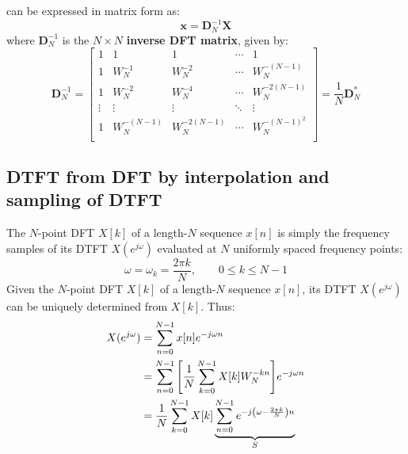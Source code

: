\documentclass[../../main/main.tex]{subfiles}
\begin{document}
can be expressed in matrix form as:
\begin{equation}
    \mathbf{x}
    =
    \mathbf{D}_{N}^{-1} \mathbf{X}
    \label{eq:L12_S18_2}
\end{equation}
where \( \mathbf{D}_{N}^{-1} \) is the \( N \times N \) \textbf{inverse DFT matrix}, given by:
\begin{equation}
    \mathbf{D}_{N}^{-1}
    =
    \begin{bmatrix}
        1   &   1   &   1   &   \cdots & 1   \\
        1   &   W_{N}^{-1}   &   W_{N}^{-2}   &   \cdots & W_{N}^{-(N-1)}   \\
        1   &   W_{N}^{-2}   &   W_{N}^{-4}   &   \cdots & W_{N}^{-2(N-1)}   \\
        \vdots  &   \vdots  &   \vdots  &   \ddots  &   \vdots  \\
        1   &   W_{N}^{-(N-1)}   &   W_{N}^{-2(N-1)}   &   \cdots & W_{N}^{-(N-1)^2}   \\
    \end{bmatrix}
    =
    \frac{1}{N} \mathbf{D}_{N}^{*}
    \label{eq:L12_S19_1}
\end{equation}



\subsection{DTFT from DFT by interpolation and sampling of DTFT}
The \( N \)-point DFT \( X[k] \) of a length-\( N \) sequence \( x[n] \) is simply the frequency samples of its DTFT \( X(e^{j\omega}) \) evaluated at \( N \) uniformly spaced frequency points:
\begin{equation}
    \omega
    =
    \omega_{k}
    =
    \frac{2\pi k}{N},
    \qquad
    0 \le k \le N-1
    \label{eq:L12_S20_1}
\end{equation}
Given the \( N \)-point DFT \( X[k] \) of a length-\( N \) sequence \( x[n] \), its DTFT \( X(e^{j\omega}) \) can be uniquely determined from \( X[k] \). Thus:
\begin{align}
    X(e^{j\omega})
    &=
        \sum_{n=0}^{N-1} x[n] e^{-j\omega n}    \nonumber   \\
    &=
        \sum_{n=0}^{N-1} \qty[\frac{1}{N} \sum_{k=0}^{N-1} X[k]W_{N}^{-kn}] e^{-j\omega n}  \nonumber   \\
    &=
        \frac{1}{N} \sum_{k=0}^{N-1} X[k] \underbrace{\sum_{n=0}^{N-1} e^{-j\qty(\omega - \frac{2\pi k}{N})n}}_{S}
\end{align}
\end{document}
